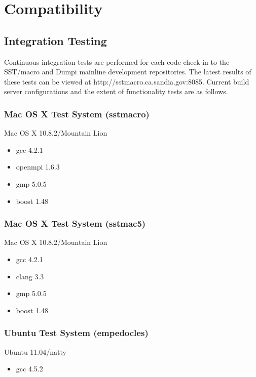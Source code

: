
\chapter{Compatibility}
\label{sec:compatibility}

\section{Integration Testing}
\label{sec:integration}

Continuous integration tests are performed for each code check in to the SST/macro and Dumpi mainline development repositories.
The latest results of these tests can be viewed at http://sstmacro.ca.sandia.gov:8085.
Current build server configurations and the extent of functionality tests are as follows.

\subsection{Mac OS X Test System (sstmacro)}
Mac OS X 10.8.2/Mountain Lion
\begin{itemize}
\item gcc 4.2.1
\item openmpi 1.6.3
\item gmp 5.0.5
\item boost 1.48
\end{itemize}

\subsection{Mac OS X Test System (sstmac5)}
Mac OS X 10.8.2/Mountain Lion
\begin{itemize}
\item gcc 4.2.1
\item clang 3.3
\item gmp 5.0.5
\item boost 1.48
\end{itemize}

\subsection{Ubuntu Test System (empedocles)}
Ubuntu 11.04/natty
\begin{itemize}
\item gcc 4.5.2
\end{itemize}


